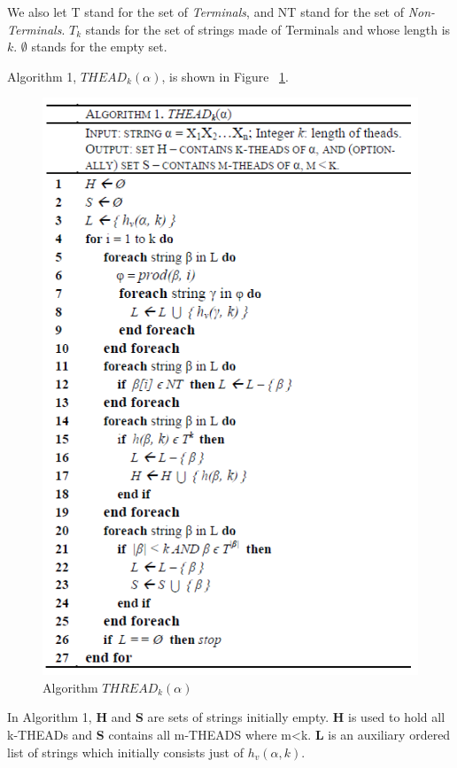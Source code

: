 \documentclass{sig-alternate-05-2015}
\begin{document}
We also let T stand for the set of \textit{Terminals}, and NT
stand for the set of \textit{Non-Terminals}. $T_k$ stands for the set of
strings made of Terminals and whose length is $k$. $\emptyset$ stands
for the empty set.

Algorithm 1, $THEAD_k(\alpha)$, is shown in Figure ~\ref{fig:thead:algorithm}.

\begin{figure}[h]
\centering
\includegraphics[scale=0.65]{thead_algorithm.PNG}
\caption{Algorithm $THREAD_k(\alpha)$}
\label{fig:thead:algorithm}
\end{figure}

\bigskip
In Algorithm 1, \textbf{H} and \textbf{S} are sets of strings initially empty.
\textbf{H} is used to hold all k-THEADs and \textbf{S} contains all m-THEADS where m<k.
\textbf{L} is an auxiliary ordered list of strings which initially
consists just of $h_v(\alpha, k)$.
\bigskip
\end{document}
